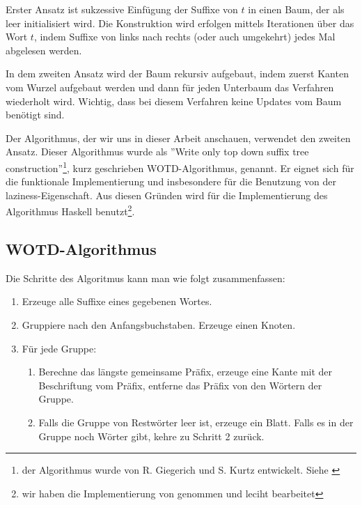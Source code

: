 \documentclass[12pt]{report}
\begin{document}
Erster Ansatz ist sukzessive Einfügung der Suffixe von $t$ in einen Baum, der als leer initialisiert wird. Die Konstruktion wird erfolgen mittels Iterationen über das Wort $t$, indem Suffixe von links nach rechts (oder auch umgekehrt) jedes Mal abgelesen werden.

In dem zweiten Ansatz wird der Baum rekursiv aufgebaut, indem zuerst Kanten vom Wurzel aufgebaut werden und dann für jeden Unterbaum das Verfahren wiederholt wird. Wichtig, dass bei diesem Verfahren keine Updates vom Baum benötigt sind.

Der Algorithmus, der wir uns in dieser Arbeit anschauen, verwendet den zweiten Ansatz. Dieser Algorithmus wurde als ''Write only top down suffix tree construction''\footnote{der Algorithmus wurde von R. Giegerich und S. Kurtz entwickelt. Siehe \cite{Giegerich1995}}, kurz geschrieben WOTD-Algorithmus, genannt. Er eignet sich für die funktionale Implementierung und insbesondere für die Benutzung von der laziness-Eigenschaft. Aus diesen Gründen wird für die Implementierung des Algorithmus Haskell benutzt\footnote{wir haben die Implementierung von \cite{Giegerich1995} genommen und leciht bearbeitet}.




\subsection{WOTD-Algorithmus}
\label{sec:WOTDAlgorithmus}

Die Schritte des Algoritmus kann man wie folgt zusammenfassen:

\begin{enumerate}
    \item Erzeuge alle Suffixe eines gegebenen Wortes.
    \item Gruppiere nach den Anfangsbuchstaben. Erzeuge einen Knoten.
    \item Für jede Gruppe:
    \begin{enumerate}
        \item Berechne das längste gemeinsame Präfix, erzeuge eine Kante mit der Beschriftung vom Präfix, entferne das Präfix von den Wörtern der Gruppe.
        \item Falls die Gruppe von Restwörter leer ist, erzeuge ein Blatt. Falls es in der Gruppe noch Wörter gibt, kehre zu Schritt 2 zurück.
    \end{enumerate}
\end{enumerate}
\end{document}
